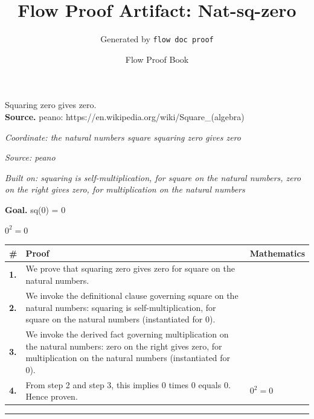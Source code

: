 \documentclass[11pt]{article}
\title{Flow Proof Artifact: Nat-sq-zero}
\author{Generated by \texttt{flow doc proof}}
\date{Flow Proof Book}
\theoremstyle{definition}
\begin{document}
\maketitle
Squaring zero gives zero.\\[0.5em]
\textbf{Source.} peano: https://en.wikipedia.org/wiki/Square\_(algebra)\\[0.5em]
\bigskip
{}\par
\smallskip\noindent\textit{Coordinate: the natural numbers \cdot square \cdot squaring zero gives zero}\par
\smallskip\noindent\textit{Source: peano}\par
\smallskip\noindent\textit{Built on: squaring is self-multiplication, for square on the natural numbers, zero on the right gives zero, for multiplication on the natural numbers}\par
\medskip
\noindent\textbf{Goal.} sq(0) = 0\par
\noindent$\displaystyle 0^{2} = 0$\par
\medskip
\noindent
\begin{tabular}{@{} >{\raggedright\arraybackslash}p{} >{\raggedright\arraybackslash}p{} >{\raggedleft\arraybackslash}p{} @{}}
\textbf{\#} & \textbf{Proof} & \textbf{Mathematics} \\
\midrule
\textbf{1.} & We prove that squaring zero gives zero for square on the natural numbers. & \\[0.45em]
\textbf{2.} & We invoke the definitional clause governing square on the natural numbers: squaring is self-multiplication, for square on the natural numbers (instantiated for 0). & \\[0.45em]
\textbf{3.} & We invoke the derived fact governing multiplication on the natural numbers: zero on the right gives zero, for multiplication on the natural numbers (instantiated for 0). & \\[0.45em]
\textbf{4.} & From step 2 and step 3, this implies 0 times 0 equals 0. Hence proven. & $\displaystyle 0^{2} = 0$ \\[0.45em]
\bottomrule
\end{tabular}
\label{thm:Nat-square-squaring_zero_gives_zero}
\par\medskip\hrule
\end{document}
